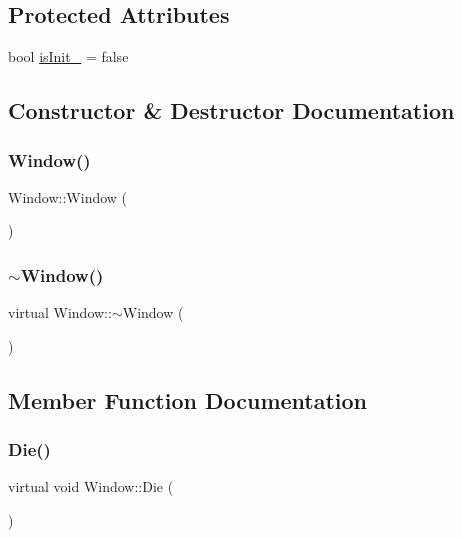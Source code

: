 \subsection*{Protected Attributes}
\begin{DoxyCompactItemize}
\item 
bool \mbox{\hyperlink{classWindow_a06739ea2d178febdb7f0da5f775e5ba8}{is\+Init\+\_\+}} = false
\end{DoxyCompactItemize}


\subsection{Constructor \& Destructor Documentation}
\mbox{\label{classWindow_a74e6087da23d3c24e9fac0245e5ec92c}} 
\subsubsection{\texorpdfstring{Window()}{Window()}}
{\footnotesize\ttfamily Window\+::\+Window (\begin{DoxyParamCaption}{ }\end{DoxyParamCaption})}

\mbox{\label{classWindow_a62b4a97b3c2e492f1d9a46092011e2d9}} 
\subsubsection{\texorpdfstring{$\sim$\+Window()}{~Window()}}
{\footnotesize\ttfamily virtual Window\+::$\sim$\+Window (\begin{DoxyParamCaption}{ }\end{DoxyParamCaption})\hspace{0.3cm}{\ttfamily [virtual]}}



\subsection{Member Function Documentation}
\mbox{\label{classWindow_a5332552d06a88b58486c0ab803356d01}} 
\subsubsection{\texorpdfstring{Die()}{Die()}}
{\footnotesize\ttfamily virtual void Window\+::\+Die (\begin{DoxyParamCaption}{ }\end{DoxyParamCaption})\hspace{0.3cm}{\ttfamily [pure virtual]}}


